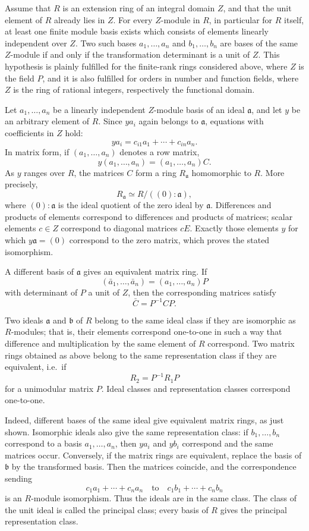 \documentclass[
  12pt,
]{article}
\begin{document}
Assume that \(R\) is an extension ring of an integral domain \(Z\), and
that the unit element of \(R\) already lies in \(Z\). For every
\(Z\)-module in \(R\), in particular for \(R\) itself, at least one
finite module basis exists which consists of elements linearly
independent over \(Z\). Two such bases \(a_1,
\ldots,a_n\) and \(b_1,
\ldots,b_n\) are bases of the same \(Z\)-module if and only if the
transformation determinant is a unit of \(Z\). This hypothesis is
plainly fulfilled for the finite-rank rings considered above, where
\(Z\) is the field \(P\), and it is also fulfilled for orders in number
and function fields, where \(Z\) is the ring of rational integers,
respectively the functional domain.

Let \(a_1,
\ldots,a_n\) be a linearly independent \(Z\)-module basis of an ideal
\(\mathfrak a\), and let \(y\) be an arbitrary element of \(R\). Since
\(ya_i\) again belongs to \(\mathfrak a\), equations with coefficients
in \(Z\) hold: \[
  ya_i=c_{i1}a_1+
\cdots+c_{in}a_n.
\] In matrix form, if \((a_1,
\ldots,a_n)\) denotes a row matrix, \[
  y(a_1,
\ldots,a_n)=(a_1,
\ldots,a_n)C.
\] As \(y\) ranges over \(R\), the matrices \(C\) form a ring
\(R_{\mathfrak a}\) homomorphic to \(R\). More precisely, \[
  R_{\mathfrak a}\simeq R/((0):\mathfrak a),
\] where \((0):\mathfrak a\) is the ideal quotient of the zero ideal by
\(\mathfrak a\). Differences and products of elements correspond to
differences and products of matrices; scalar elements \(c\in Z\)
correspond to diagonal matrices \(cE\). Exactly those elements \(y\) for
which \(y\mathfrak a=(0)\) correspond to the zero matrix, which proves
the stated isomorphism.

A different basis of \(\mathfrak a\) gives an equivalent matrix ring. If
\[
  (\bar a_1,
\ldots,\bar a_n)=(a_1,
\ldots,a_n)P
\] with determinant of \(P\) a unit of \(Z\), then the corresponding
matrices satisfy \[
  \bar C=P^{-1}CP.
\]

Two ideals \(\mathfrak a\) and \(\mathfrak b\) of \(R\) belong to the
same ideal class if they are isomorphic as \(R\)-modules; that is, their
elements correspond one-to-one in such a way that difference and
multiplication by the same element of \(R\) correspond. Two matrix rings
obtained as above belong to the same representation class if they are
equivalent, i.e.~if \[
  R_2=P^{-1}R_1P
\] for a unimodular matrix \(P\). Ideal classes and representation
classes correspond one-to-one.

Indeed, different bases of the same ideal give equivalent matrix rings,
as just shown. Isomorphic ideals also give the same representation
class: if \(b_1,
\ldots,b_n\) correspond to a basis \(a_1,
\ldots,a_n\), then \(ya_i\) and \(yb_i\) correspond and the same
matrices occur. Conversely, if the matrix rings are equivalent, replace
the basis of \(\mathfrak b\) by the transformed basis. Then the matrices
coincide, and the correspondence sending \[
  c_1a_1+
\cdots+c_na_n
  \quad\text{to}\quad
  c_1b_1+
\cdots+c_nb_n
\] is an \(R\)-module isomorphism. Thus the ideals are in the same
class. The class of the unit ideal is called the principal class; every
basis of \(R\) gives the principal representation class.
\end{document}
